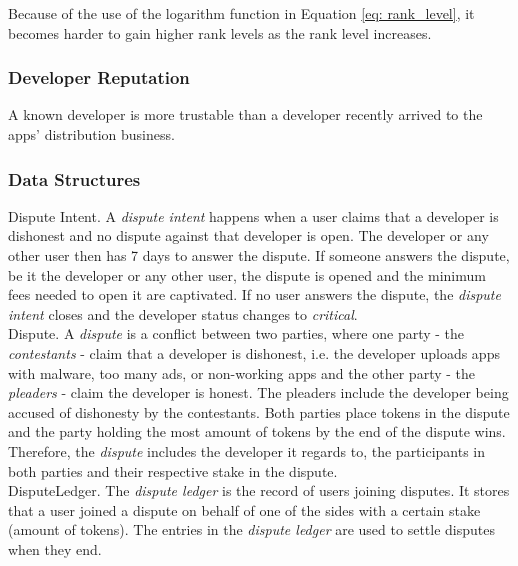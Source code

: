 Because of the use of the logarithm function in Equation \ref{eq: rank_level}, it becomes harder to gain higher rank levels as the rank level increases.

\subsubsection{Developer Reputation}

A known developer is more trustable than a developer recently arrived to the apps' distribution business.

\subsubsection{Data Structures}

\noindent \textsf{Dispute Intent}. A \textit{dispute intent} happens when a user claims that a developer is dishonest and no dispute against that developer is open. The developer or any other user then has 7 days to answer the dispute. If someone answers the dispute, be it the developer or any other user, the dispute is opened and the minimum fees needed to open it are captivated. If no user answers the dispute, the \textit{dispute intent} closes and the developer status changes to \textit{critical}. \\

\noindent \textsf{Dispute}. A \textit{dispute} is a conflict between two parties, where one party - the \textit{contestants} - claim that a developer is dishonest, i.e. the developer uploads apps with malware, too many ads, or non-working apps and the other party - the \textit{pleaders} - claim the developer is honest. The pleaders include the developer being accused of dishonesty by the contestants. Both parties place tokens in the dispute and the party holding the most amount of tokens by the end of the dispute wins. Therefore, the \textit{dispute} includes the developer it regards to, the participants in both parties and their respective stake in the dispute. \\

\noindent \textsf{DisputeLedger}. The \textit{dispute ledger} is the record of users joining disputes. It stores that a user joined a dispute on behalf of one of the sides with a certain stake (amount of tokens). The entries in the \textit{dispute ledger} are used to settle disputes when they end. \\

